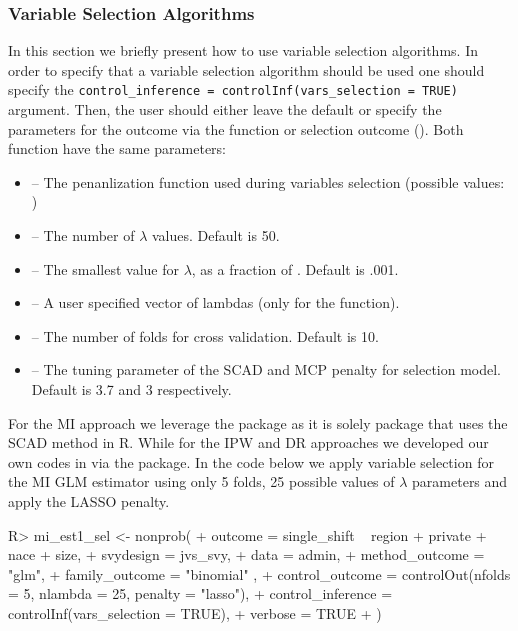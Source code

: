 \documentclass[
]{jss}
\begin{document}
\subsubsection{Variable Selection
Algorithms}\label{variable-selection-algorithms}

In this section we briefly present how to use variable selection
algorithms. In order to specify that a variable selection algorithm
should be used one should specify the
\texttt{control\_inference\ =\ controlInf(vars\_selection\ =\ TRUE)}
argument. Then, the user should either leave the default or specify the
parameters for the outcome via the  function or
selection outcome (). Both function have the same
parameters:

\begin{itemize}
\item {} -- The penanlization function used during variables selection (possible values: )
\item {} -- The number of $\lambda$ values. Default is 50.
\item {} -- The smallest value for $\lambda$, as a fraction of . Default is .001.
\item {} -- A user specified vector of lambdas (only for the  function).
\item {} -- The number of folds for cross validation. Default is 10.
\item {} -- The tuning parameter of the SCAD and MCP penalty for selection model. Default is 3.7 and 3 respectively.
\end{itemize}

For the MI approach we leverage the  package \citep{ncvreg}
as it is solely package that uses the SCAD method in R. While for the
IPW and DR approaches we developed our own codes in  via
the  package. In the code below we apply variable selection
for the MI GLM estimator using only 5 folds, 25 possible values of
\(\lambda\) parameters and apply the LASSO penalty.

\begin{CodeChunk}
\begin{CodeInput}
R> mi_est1_sel <- nonprob(
+   outcome = single_shift ~ region + private + nace + size,
+   svydesign = jvs_svy,
+   data = admin,
+   method_outcome = "glm",
+   family_outcome = "binomial" ,
+   control_outcome = controlOut(nfolds = 5, nlambda = 25, penalty = "lasso"),
+   control_inference = controlInf(vars_selection = TRUE),
+   verbose = TRUE
+ )
\end{CodeInput}
\end{CodeChunk}
\end{document}
